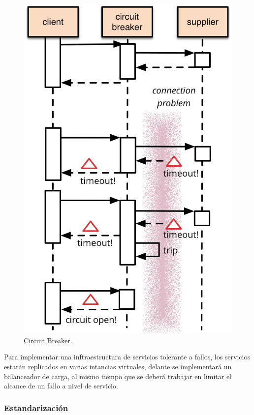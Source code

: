 \begin{figure}
  \includegraphics[width=\linewidth]{src/images/03-capitulo-3/circuit_breaker.png}
  \caption{Circuit Breaker.}
  \label{fig:circuit_breaker}
\end{figure}

Para implementar una inftraestructura de servicios tolerante a fallos, los servicios estarán replicados en varias intancias virtuales, delante se implementará un balanceador de carga, al mismo tiempo que se deberá trabajar en limitar el alcance de un fallo a nivel de servicio.


\subsubsection{Estandarización}


